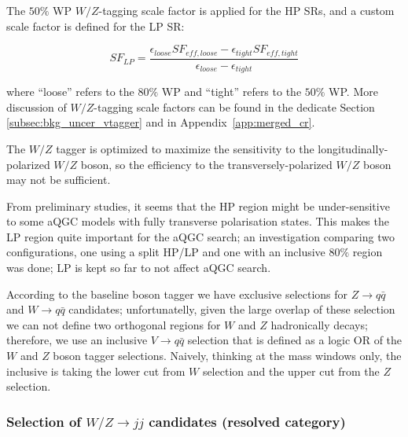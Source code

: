 The $50\%$ WP $W/Z$-tagging scale factor is applied for the HP SRs, and a custom scale factor is defined for the LP SR:

    \begin{equation}
    SF_{LP} = \frac{\epsilon_{loose}SF_{eff,loose}- \epsilon_{tight}SF_{eff,tight} }{ \epsilon_{loose}- \epsilon_{tight}}
    \end{equation}

where ``loose'' refers to the $80\%$ WP and ``tight'' refers to the $50\%$ WP.
More discussion of $W/Z$-tagging scale factors can be found in the dedicate 
Section \ref{subsec:bkg_uncer_vtagger}
and in Appendix~\ref{app:merged_cr}.

The $W/Z$ tagger is optimized to maximize the sensitivity to the longitudinally-polarized $W/Z$ boson, 
so the efficiency to the transversely-polarized $W/Z$ boson may not be sufficient.

From preliminary studies, it seems that the HP region might be under-sensitive to some aQGC models with fully transverse polarisation states. This makes the LP region quite important for the aQGC search; an investigation comparing two configurations, one using a split HP/LP and one with an inclusive $80\%$ region was done; LP is kept so far to not affect aQGC search.

According to the baseline boson tagger we have exclusive selections for $Z\to q\bar{q}$ and $W\to q\bar{q}$ candidates; 
unfortunatelly, given the large overlap of these selection we can not define two orthogonal regions for $W$ and $Z$ hadronically decays; 
therefore, we use an inclusive $V \to q\bar{q}$ selection that is defined as a logic OR of the $W$ and $Z$ boson tagger selections.
Naively, thinking at the mass windows only, the inclusive is taking the lower cut from $W$ selection and 
the upper cut from the $Z$ selection.




\subsubsection{Selection of $W/Z \to jj$ candidates (resolved category)}
\label{subsubsec:resolved_jets_selection}

